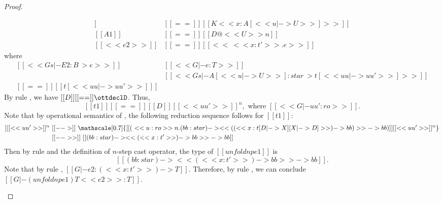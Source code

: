 \begin{proof}
\begin{description}
\begin{align*}
                [[p]] &[[==]] [[K <<x:A[<< u |-> U >>]>>]] \\
                [[A1]] &[[==]] [[D@<<U>>n]] \\
                [[<<e2>>]] &[[==]] [[<<\ <<x:t'>> .e>>]]
            \end{align*}
            where
            \[\begin{array}{ll}
                [[<<Gs |- E2 : B ~> e>>]] &
                [[<<G |- e : T>>]] \\
                [[<<Gs |- U : star ~> uu'>>]] &
                [[<<Gs |- A[<< u |-> U >>]:star ~> t[<<uu |-> uu'>>]>>]] \\
                [[t']] [[==]] [[ t[<<uu |-> uu'>>] ]]
            \end{array}\]
            By rule , we have $[[D]]  [[ == ]] \ottdeclD$. Thus,
            \[ [[t1]] [[==]] [[D]] [[<<uu'>>]]^n,\text{ where }[[<<G |- uu' : ro>>]].\] 
            Note that by operational semantics of \name, the following reduction sequence follows for $[[t1]]$:
            \begin{align*}
                [[D]] [[<<uu'>>]]^n~
                &[[-->]]~ \mathscale[0.7]{[[(\ <<u:ro>>n . (bb:star) -> << ((<<x : t[D |-> X][X |-> D]>>) -> bb) >> -> bb) ]][[<<uu'>>]]^n}\\
                &[[-->>]]~ [[(bb:star) -> << (<<x:t'>>) -> bb >> -> bb]]
            \end{align*}
            Then by
            rule  and the definition of $n$-step cast operator, the
            type of $[[unfoldnp e1]]$ is \[ [[(bb:star) -> << (<<x:t'>>) -> bb >> -> bb]].\] Note
            that by rule , $[[G |- e2 : (<<x:t'>>) -> T]]$. Therefore, by rule
            , we can conclude $[[G |- (unfoldnp e1) T <<e2>> : T]]$.
    \end{description}
\end{proof}

